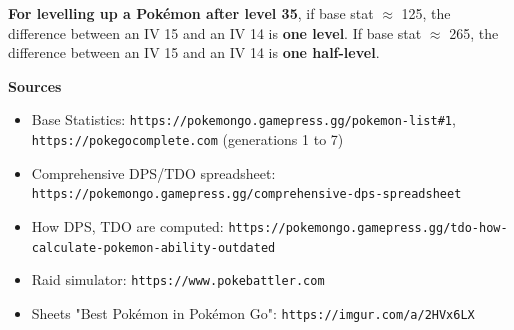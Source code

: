 \documentclass[8pt,aspectratio=169,compress]{beamer}
\begin{document}
\begin{frame}
\begin{block}{}
\begin{tiny}
\textbf{For levelling up a Pok\'emon after level 35}, if base stat $\approx$ 125, the difference between an IV 15 and an IV 14 is \textbf{one level}. If base stat $\approx$ 265, the difference between an IV 15 and an IV 14 is \textbf{one half-level}.  



\medskip

\textbf{Sources}

\begin{itemize}
  \item Base Statistics: \texttt{https://pokemongo.gamepress.gg/pokemon-list\#1}, \texttt{https://pokegocomplete.com} (generations 1 to 7)
  \item Comprehensive DPS/TDO spreadsheet: \texttt{https://pokemongo.gamepress.gg/comprehensive-dps-spreadsheet}
  \item How DPS, TDO are computed: \texttt{https://pokemongo.gamepress.gg/tdo-how-calculate-pokemon-ability-outdated}
  \item Raid simulator: \texttt{https://www.pokebattler.com}
  \item Sheets "Best Pok\'emon in Pok\'emon Go": \texttt{https://imgur.com/a/2HVx6LX}%
\end{itemize}

\end{tiny}
\end{block}
\end{frame}
\end{document}
